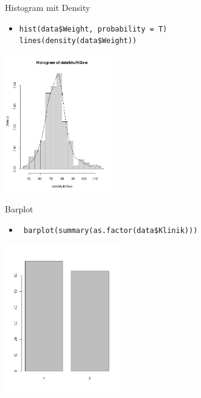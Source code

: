 \documentclass[aspectratio = 169]{chariteBeamer}
\begin{document}
\begin{frame}[fragile]{Histogram mit Density}
	\begin{itemize}
		\item \verb+hist(data$Weight, probability = T) + \\ \verb +lines(density(data$Weight))+
	\end{itemize}
			
	\begin{center}
		\includegraphics[height=6cm]{Density}
	\end{center}
\end{frame}

\begin{frame}[fragile]{Barplot}
	\begin{itemize}
		\item \verb+ barplot(summary(as.factor(data$Klinik)))+
	\end{itemize}
			
	\begin{center}
		\includegraphics[height=6.5cm]{Barplot}
	\end{center}
\end{frame}
\end{document}
